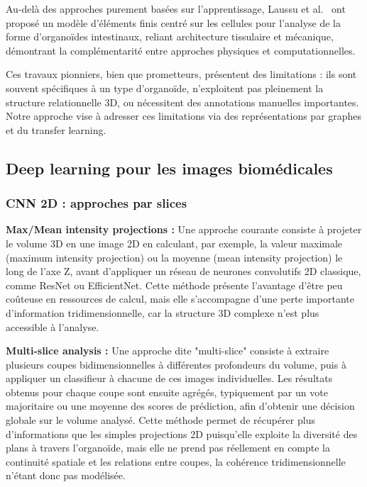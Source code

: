 Au-delà des approches purement basées sur l'apprentissage, Laussu et al.~\cite{Laussu2024} ont proposé un modèle d'éléments finis centré sur les cellules pour l'analyse de la forme d'organoïdes intestinaux, reliant architecture tissulaire et mécanique, démontrant la complémentarité entre approches physiques et computationnelles.

Ces travaux pionniers, bien que prometteurs, présentent des limitations : ils sont souvent spécifiques à un type d'organoïde, n'exploitent pas pleinement la structure relationnelle 3D, ou nécessitent des annotations manuelles importantes. Notre approche vise à adresser ces limitations via des représentations par graphes et du transfer learning.

\subsection{Deep learning pour les images biomédicales}

\subsubsection{CNN 2D : approches par slices}

\textbf{Max/Mean intensity projections :}
Une approche courante consiste à projeter le volume 3D en une image 2D en calculant, par exemple, la valeur maximale (maximum intensity projection) ou la moyenne (mean intensity projection) le long de l’axe Z, avant d’appliquer un réseau de neurones convolutifs 2D classique, comme ResNet ou EfficientNet. Cette méthode présente l’avantage d’être peu coûteuse en ressources de calcul, mais elle s’accompagne d’une perte importante d’information tridimensionnelle, car la structure 3D complexe n’est plus accessible à l’analyse.

\textbf{Multi-slice analysis :}
Une approche dite "multi-slice" consiste à extraire plusieurs coupes bidimensionnelles à différentes profondeurs du volume, puis à appliquer un classifieur à chacune de ces images individuelles. Les résultats obtenus pour chaque coupe sont ensuite agrégés, typiquement par un vote majoritaire ou une moyenne des scores de prédiction, afin d’obtenir une décision globale sur le volume analysé. Cette méthode permet de récupérer plus d’informations que les simples projections 2D puisqu’elle exploite la diversité des plans à travers l’organoïde, mais elle ne prend pas réellement en compte la continuité spatiale et les relations entre coupes, la cohérence tridimensionnelle n’étant donc pas modélisée.

